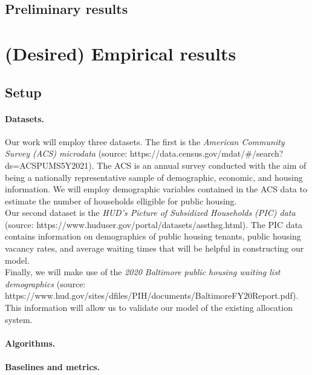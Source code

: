 \documentclass[11pt]{article}
\begin{document}
\subsection{Preliminary results}


\section{(Desired) Empirical results}

\subsection{Setup}
\paragraph{Datasets.}
Our work will employ three datasets. The first is the \textit{American Community Survey (ACS) microdata} (source: https://data.census.gov/mdat/\#/search?ds=ACSPUMS5Y2021). The ACS is an annual survey conducted with the aim of being a nationally representative sample of demographic, economic, and housing information. We will employ demographic variables contained in the ACS data to estimate the number of households elligible for public housing. \\
\newline
Our second dataset is the \textit{HUD’s Picture of Subsidized Households (PIC) data} (source: https://www.huduser.gov/portal/datasets/assthsg.html). The PIC data contains information on demographics of public housing tenants, public housing vacancy rates, and average waiting times that will be helpful in constructing our model. \\
\newline
Finally, we will make use of the \textit{2020 Baltimore public housing waiting list demographics} (source: https://www.hud.gov/sites/dfiles/PIH/documents/BaltimoreFY20Report.pdf). This information will allow us to validate our model of the existing allocation system.

\paragraph{Algorithms.}

\paragraph{Baselines and metrics.}
\end{document}
